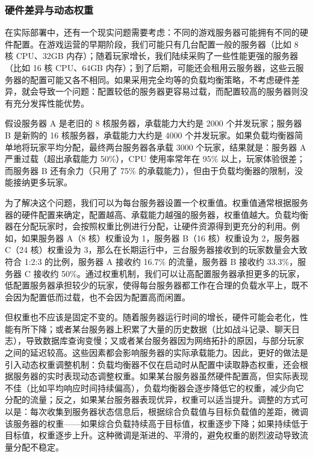 \subsubsection{硬件差异与动态权重}

在实际部署中，还有一个现实问题需要考虑：不同的游戏服务器可能拥有不同的硬件配置。在游戏运营的早期阶段，我们可能只有几台配置一般的服务器（比如 8 核 CPU、32GB 内存）；随着玩家增长，我们陆续采购了一些性能更强的服务器（比如 16 核 CPU、64GB 内存）；到了后期，可能还会租用云服务器，这些云服务器的配置可能又各不相同。如果采用完全均等的负载均衡策略，不考虑硬件差异，就会导致一个问题：配置较低的服务器更容易过载，而配置较高的服务器则没有充分发挥性能优势。

假设服务器 A 是老旧的 8 核服务器，承载能力大约是 2000 个并发玩家；服务器 B 是新购的 16 核服务器，承载能力大约是 4000 个并发玩家。如果负载均衡器简单地将玩家平均分配，最终两台服务器各承载 3000 个玩家，结果就是：服务器 A 严重过载（超出承载能力 50\%），CPU 使用率常年在 95\% 以上，玩家体验很差；而服务器 B 还有余力（只用了 75\% 的承载能力），但由于负载均衡器的限制，没能接纳更多玩家。

为了解决这个问题，我们可以为每台服务器设置一个权重值。权重值通常根据服务器的硬件配置来确定，配置越高、承载能力越强的服务器，权重值越大。负载均衡器在分配玩家时，会按照权重比例进行分配，让硬件资源得到更充分的利用。例如，如果服务器 A（8 核）权重设为 1，服务器 B（16 核）权重设为 2，服务器 C（24 核）权重设为 3，那么在长期运行中，三台服务器接收到的玩家数量会大致符合 1:2:3 的比例，服务器 A 接收约 16.7\% 的流量，服务器 B 接收约 33.3\%，服务器 C 接收约 50\%。通过权重机制，我们可以让高配置服务器承担更多的玩家，低配置服务器承担较少的玩家，使得每台服务器都工作在合理的负载水平上，既不会因为配置低而过载，也不会因为配置高而闲置。

但权重也不应该是固定不变的。随着服务器运行时间的增长，硬件可能会老化，性能有所下降；或者某台服务器上积累了大量的历史数据（比如战斗记录、聊天日志），导致数据库查询变慢；又或者某台服务器因为网络拓扑的原因，与部分玩家之间的延迟较高。这些因素都会影响服务器的实际承载能力。因此，更好的做法是引入动态权重调整机制：负载均衡器不仅在启动时从配置中读取静态权重，还会根据服务器的实时表现动态调整权重。如果某台服务器虽然硬件配置高，但实际表现不佳（比如平均响应时间持续偏高），负载均衡器会逐步降低它的权重，减少向它分配的流量；反之，如果某台服务器表现优异，权重可以适当提升。调整的方式可以是：每次收集到服务器状态信息后，根据综合负载值与目标负载值的差距，微调该服务器的权重——如果综合负载持续高于目标值，权重逐步下降；如果持续低于目标值，权重逐步上升。这种微调是渐进的、平滑的，避免权重的剧烈波动导致流量分配不稳定。

